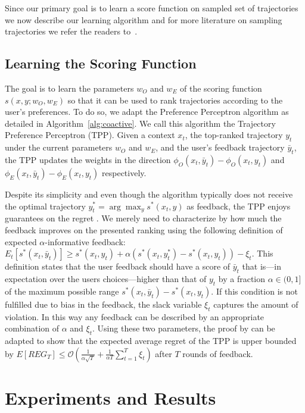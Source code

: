 Since our primary goal is to learn a score function on sampled set of trajectories we now describe our learning algorithm and for more literature on sampling trajectories we refer the readers to~\citep{Green07}.

\subsection{Learning the Scoring Function} 
\label{sec:learningscore}

The goal is to learn the parameters $w_O$ and $w_E$ of the scoring function $s(x,y;w_O,w_E)$ so that it can be used to rank trajectories according to the user's preferences. To do so, we adapt the Preference Perceptron algorithm \cite{Shivaswamy12} as detailed in Algorithm~\ref{alg:coactive}. We call this algorithm the Trajectory Preference Perceptron (TPP). Given a context $x_t$, the top-ranked trajectory $y_t$ under the current parameters $w_O$ and $w_E$, and the user's feedback trajectory $\bar{y}_t$, the TPP updates the weights in the direction 
${\phi}_O(x_t,\bar{y}_t) - {\phi}_O(x_t,{y}_t)$ and
${\phi}_E(x_t,\bar{y}_t) - {\phi}_E(x_t,{y_t})$ respectively. 

Despite its simplicity and even though the algorithm typically does not receive the optimal trajectory $y_t^* = \arg\max_ys^*(x_t,y)$ as feedback, the TPP enjoys guarantees on the regret \cite{Shivaswamy12}. We merely need to characterize by how much the feedback improves on the presented ranking using the following definition of expected $\alpha$-informative feedback: $
E_t[s^*(x_t,\bar{y}_t) ] \geq s^*(x_t,y_t) + 
\alpha ( s^*(x_t,y^*_t) - s^*(x_t,y_t)) - \xi_t
$.
This definition states that the user feedback should have a score of ${\bar{y}}_t$ that is---in expectation over the users choices---higher than that of ${y}_t$ by a fraction $\alpha
\in (0,1]$ of the maximum possible range $s^*(x_t,{\bar{y}}_t) - s^*(x_t,{y}_t)$. If this condition is not fulfilled due to bias in the feedback, the slack variable $\xi_t$ captures the amount of violation. In this way any feedback can be described by an appropriate combination of $\alpha$ and $\xi_t$.
 Using these two parameters, the proof by \citep{Shivaswamy12} can be adapted to show that the expected average regret of the TPP is upper bounded by $ E[REG_T] \le \mathcal{O} (\frac{1}{\alpha\sqrt{T}} + \frac{1}{\alpha T}\sum_{t=1}^T \xi_t ) $ after $T$ rounds of feedback.

\section{Experiments and Results}

